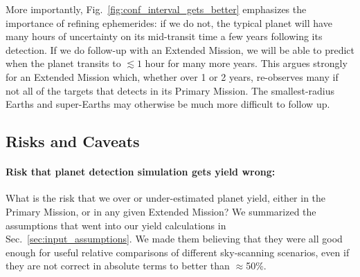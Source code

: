 More importantly, Fig.~\ref{fig:conf_interval_gets_better} emphasizes the importance of refining \tesss ephemerides: if we do not, the typical \tess planet will have many hours of uncertainty on its mid-transit time a few years following its detection.
If we do follow-up with an Extended Mission, we will be able to predict when 
the planet transits to $\lesssim1$ hour for many more years.
This argues strongly for an Extended Mission which, whether over 1 or 2 years, re-observes many if not all of the targets that \tess detects in its Primary Mission. 
The smallest-radius Earths and super-Earths may otherwise be much more 
difficult to follow up.


\subsection{Risks and Caveats}
\label{sec:risks_caveats}
\paragraph{Risk that planet detection simulation gets yield wrong:}
What is the risk that we over or under-estimated \tesss planet yield, either in the Primary Mission, or in any given Extended Mission?
We summarized the assumptions that went into our yield calculations in Sec.~\ref{sec:input_assumptions}.
We made them believing that they were all good enough for useful relative comparisons of different sky-scanning scenarios,
even if they are not correct in absolute terms to better than $\approx$50\%.

